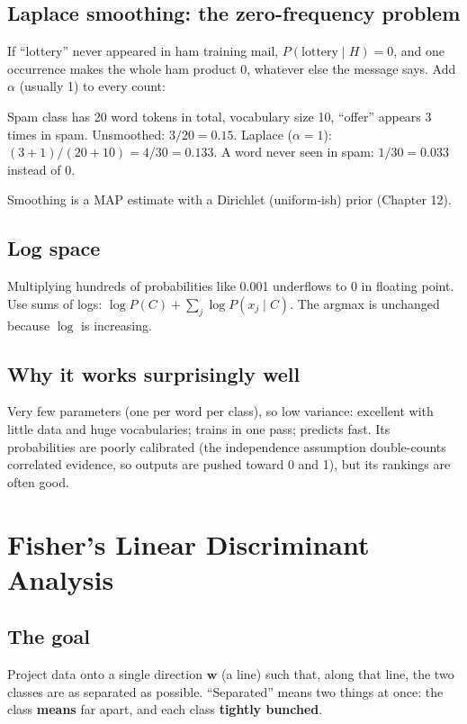 \subsection{Laplace smoothing: the zero-frequency problem}
If ``lottery'' never appeared in ham training mail, $P(\text{lottery}\mid H) = 0$, and one occurrence makes the whole ham
product 0, whatever else the message says. Add $\alpha$ (usually 1) to every count:
\begin{example}[: smoothing]
Spam class has 20 word tokens in total, vocabulary size 10, ``offer'' appears 3 times in spam.
Unsmoothed: $3/20 = 0.15$. Laplace ($\alpha = 1$): $(3+1)/(20+10) = 4/30 = 0.133$. A word never seen in spam:
$1/30 = 0.033$ instead of 0.
\end{example}
Smoothing is a MAP estimate with a Dirichlet (uniform-ish) prior (Chapter 12).

\subsection{Log space}
Multiplying hundreds of probabilities like 0.001 underflows to 0 in floating point. Use sums of logs:
$\log P(C) + \sum_j\log P(x_j\mid C)$. The argmax is unchanged because $\log$ is increasing.

\subsection{Why it works surprisingly well}
Very few parameters (one per word per class), so low variance: excellent with little data and huge vocabularies; trains in one
pass; predicts fast. Its probabilities are poorly calibrated (the independence assumption double-counts correlated evidence, so
outputs are pushed toward 0 and 1), but its rankings are often good.

\section{Fisher's Linear Discriminant Analysis}

\subsection{The goal}
Project data onto a single direction $\mathbf w$ (a line) such that, along that line, the two classes are as separated as
possible. ``Separated'' means two things at once: the class \textbf{means} far apart, and each class \textbf{tightly bunched}.

